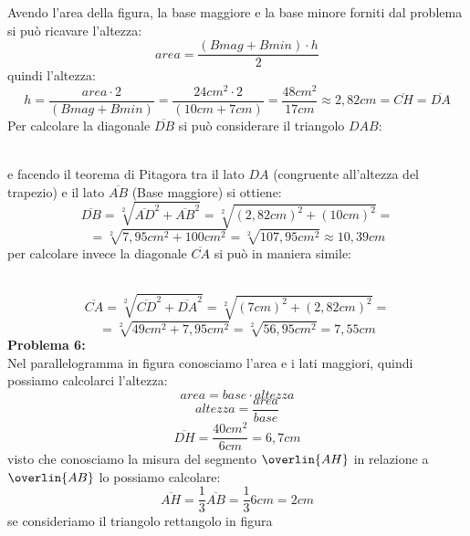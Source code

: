 \documentclass[14pt]{extarticle}
\begin{document}
Avendo l'area della figura, la base maggiore e la base minore forniti dal problema si può ricavare l'altezza:
\[area=\dfrac{(Bmag+Bmin)\cdot h}{2}\]
quindi l'altezza:
\[h=\dfrac{area\cdot 2}{(Bmag+Bmin)}=\dfrac{24cm^2\cdot 2}{(10cm+7cm)}=\dfrac{48cm^2}{17cm}\approx2,82cm=\overline{CH}=\overline{DA}\]
Per calcolare la diagonale \(\overline{DB}\) si può considerare il triangolo \(DAB\):\\
\\
e facendo il teorema di Pitagora tra il lato \(DA\) (congruente all'altezza del trapezio) e il lato \(\overline{AB}\) (Base maggiore) si ottiene:\\
\[\overline{DB}=\sqrt[2]{\overline{AD}^2+\overline{AB}^2}=\sqrt[2]{(2,82cm)^2+(10cm)^2}=\]\[=\sqrt[2]{7,95cm^2+100cm^2}=\sqrt[2]{107,95cm^2}\approx10,39cm\]
per calcolare invece la diagonale \(\overline{CA}\) si può in maniera simile:\\
\\
\[\overline{CA}=\sqrt[2]{\overline{CD}^2+\overline{DA}^2}=\sqrt[2]{(7cm)^2+(2,82cm)^2}=\]\[=\sqrt[2]{49cm^2+7,95cm^2}=\sqrt[2]{56,95cm^2}=7,55cm\]
\textbf{Problema 6:}\\
Nel parallelogramma in figura conosciamo l'area e i lati maggiori, quindi possiamo calcolarci l'altezza:\\
\[area=base\cdot altezza\]
\[altezza=\dfrac{area}{base}\]
\[\overline{DH}=\dfrac{40cm^2}{6cm}=6,7cm\]
visto che conosciamo la misura del segmento \(\overlin{AH}\) in relazione a \(\overlin{AB}\) lo possiamo calcolare:
\[\overline{AH}=\dfrac{1}{3}\overline{AB}=\dfrac{1}{3}6cm=2cm\]
se consideriamo il triangolo rettangolo in figura\vspace{0.5cm}\\
\end{document}
